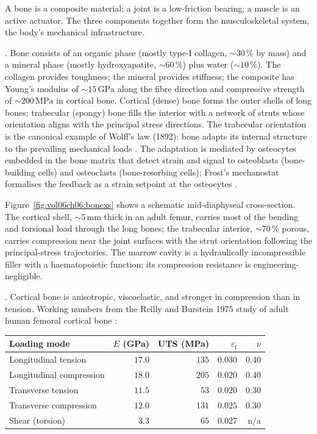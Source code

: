 A bone is a composite material; a joint is a low-friction bearing; a
muscle is an active actuator. The three components together form the
musculoskeletal system, the body's mechanical infrastructure.

. Bone consists of an organic
phase (mostly type-I collagen, $\sim 30\,\%$ by mass) and a mineral
phase (mostly hydroxyapatite, $\sim 60\,\%$) plus water ($\sim 10\,\%$).
The collagen provides toughness; the mineral provides stiffness; the
composite has Young's modulus of $\sim 15\,\text{GPa}$ along the
fibre direction and compressive strength of $\sim 200\,\text{MPa}$
in cortical bone. Cortical (dense) bone forms the outer shells of
long bones; trabecular (spongy) bone fills the interior with a
network of struts whose orientation aligns with the principal
stress directions. The trabecular orientation is the canonical
example of Wolff's law (1892): bone adapts its internal structure to
the prevailing mechanical loads
\cite[ch.~1]{paper:v6c06-wolff-1892}. The adaptation is mediated by
osteocytes embedded in the bone matrix that detect strain and signal
to osteoblasts (bone-building cells) and osteoclasts (bone-resorbing
cells); Frost's mechanostat formalises the feedback as a strain
setpoint at the osteocytes
\cite[p.~74]{paper:v6c06-frost-1987}.

Figure~\ref{fig:vol06ch06:bonexs} shows a schematic mid-diaphyseal
cross-section. The cortical shell, $\sim 5\,\text{mm}$ thick in an
adult femur, carries most of the bending and torsional load through
the long bones; the trabecular interior, $\sim 70\,\%$ porous, carries
compression near the joint surfaces with the strut orientation
following the principal-stress trajectories. The marrow cavity is a
hydraulically incompressible filler with a haematopoietic function;
its compression resistance is engineering-negligible.



. Cortical bone is
anisotropic, viscoelastic, and stronger in compression than in
tension. Working numbers from the Reilly and Burstein 1975 study of
adult human femoral cortical bone
\cite[Tab.~3]{paper:v6c06-reilly-burstein-1975}:

\begin{center}
\begin{tabular}{lrrrr}
\toprule
Loading mode & $E$ (GPa) & UTS (MPa) & $\varepsilon_{\text{f}}$ & $\nu$ \\
\midrule
Longitudinal tension     & $17.0$ & $135$ & $0.030$ & $0.40$ \\
Longitudinal compression & $18.0$ & $205$ & $0.020$ & $0.40$ \\
Transverse tension       & $11.5$ & $\phantom{0}53$ & $0.020$ & $0.30$ \\
Transverse compression   & $12.0$ & $131$ & $0.025$ & $0.30$ \\
Shear (torsion)          & $\phantom{0}3.3$ & $\phantom{0}65$ & $0.027$ & n/a \\
\bottomrule
\end{tabular}
\end{center}

